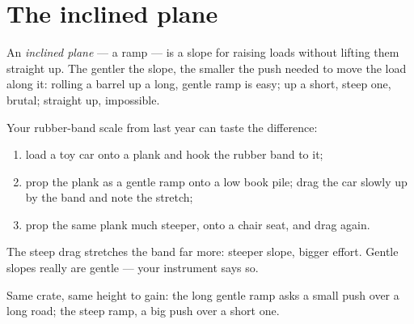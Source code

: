 \section{The inclined plane}

\begin{definition}\label{def:g5:simple-machines:ramp}
An \emph{inclined plane} --- a ramp --- is a
slope for raising loads without lifting them straight up. The
gentler the slope, the smaller the push needed to move the load
along it: rolling a barrel up a long, gentle ramp is easy; up a
short, steep one, brutal; straight up, impossible.
\end{definition}

\begin{method}\label{met:g5:simple-machines:measure}
Your rubber-band scale from last year can taste the difference:
\begin{enumerate}
  \item load a toy car onto a plank and hook the rubber band to it;
  \item prop the plank as a gentle ramp onto a low book pile; drag
        the car slowly up by the band and note the stretch;
  \item prop the same plank much steeper, onto a chair seat, and
        drag again.
\end{enumerate}
The steep drag stretches the band far more: steeper slope, bigger
effort. Gentle slopes really are gentle --- your instrument says
so.
\end{method}

\begin{omfigure}

{\small Same crate, same height to gain: the long gentle ramp asks
a small push over a long road; the steep ramp, a big push over a
short one.}
\end{omfigure}

